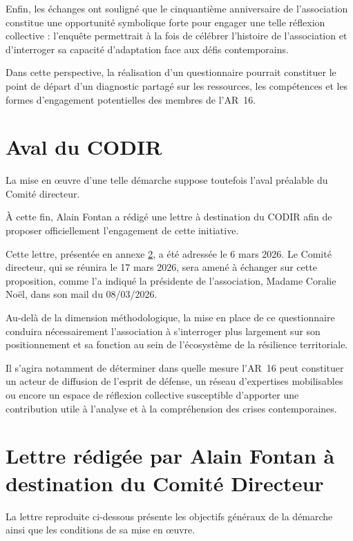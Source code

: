 \documentclass[12pt,a4paper]{article}
\begin{document}
Enfin, les échanges ont souligné que le cinquantième anniversaire de
l'association constitue une opportunité symbolique forte pour engager une
telle réflexion collective : l'enquête permettrait à la fois de célébrer
l'histoire de l'association et d'interroger sa capacité d'adaptation face aux
défis contemporains.

Dans cette perspective, la réalisation d'un questionnaire pourrait constituer
le point de départ d'un diagnostic partagé sur les ressources, les compétences
et les formes d'engagement potentielles des membres de l'AR~16.

\section{Aval du CODIR}

La mise en œuvre d'une telle démarche suppose toutefois l'aval préalable
du Comité directeur.

À cette fin, Alain Fontan a rédigé une lettre à destination du CODIR afin
de proposer officiellement l'engagement de cette initiative.

Cette lettre, présentée en annexe \ref{annexe:lettre_Alain_Fontan}, a été
adressée le 6 mars 2026. Le Comité directeur, qui se réunira le 17 mars 2026, 
sera amené à échanger sur cette proposition, comme l'a indiqué la présidente 
de l'association, Madame Coralie Noël, dans son mail du 08/03/2026.

Au-delà de la dimension méthodologique, la mise en place de ce questionnaire
conduira nécessairement l'association à s'interroger plus largement sur son
positionnement et sa fonction au sein de l'écosystème de la résilience
territoriale.

Il s'agira notamment de déterminer dans quelle mesure l'AR~16 peut constituer
un acteur de diffusion de l'esprit de défense, un réseau d'expertises
mobilisables ou encore un espace de réflexion collective susceptible
d'apporter une contribution utile à l'analyse et à la compréhension des
crises contemporaines.

\newpage

\appendix

\section{Lettre rédigée par Alain Fontan à destination du Comité Directeur}
\label{annexe:lettre_Alain_Fontan}

La lettre reproduite ci-dessous présente les objectifs généraux de la
démarche ainsi que les conditions de sa mise en œuvre.
\end{document}
